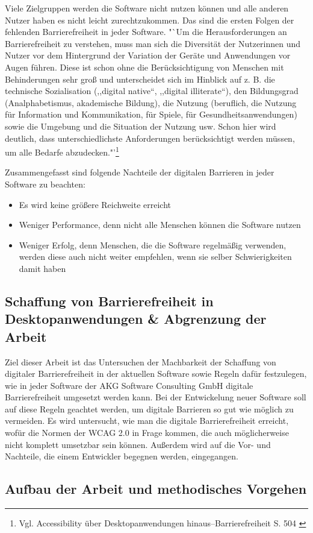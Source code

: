Viele Zielgruppen werden die Software nicht nutzen können und alle anderen Nutzer haben es nicht leicht zurechtzukommen. Das sind die ersten Folgen der fehlenden Barrierefreiheit in jeder Software. "`Um die Herausforderungen an Barrierefreiheit zu verstehen, muss man sich die Diversität der Nutzerinnen und Nutzer vor dem Hintergrund der Variation der Geräte und Anwendungen vor Augen führen. Diese ist schon ohne die Berücksichtigung von Menschen mit Behinderungen sehr groß und unterscheidet sich im Hinblick auf z. B. die technische Sozialisation (,,digital native“, ,,digital illiterate“), den Bildungsgrad (Analphabetismus, akademische Bildung), die Nutzung (beruflich, die Nutzung für Information und Kommunikation, für Spiele, für Gesundheitsanwendungen) sowie die Umgebung und die Situation der Nutzung usw. Schon hier wird deutlich, dass unterschiedlichste Anforderungen berücksichtigt werden müssen, um alle Bedarfe abzudecken."'\footnote{Vgl. Accessibility über Desktopanwendungen hinaus–Barrierefreiheit S. 504 \cite{buhler2017accessibility}}

Zusammengefasst sind folgende Nachteile der digitalen Barrieren in jeder Software zu beachten:
\vspace{1em}

\begin{itemize}
	\item Es wird keine größere Reichweite erreicht
	\item Weniger Performance, denn nicht alle Menschen können die Software nutzen
	\item Weniger Erfolg, denn Menschen, die die Software regelmäßig verwenden, werden diese auch nicht weiter empfehlen, wenn sie selber Schwierigkeiten damit haben
\end{itemize}

\subsection{Schaffung von Barrierefreiheit in Desktopanwendungen \& Abgrenzung der Arbeit}
Ziel dieser Arbeit ist das Untersuchen der Machbarkeit der Schaffung von digitaler Barrierefreiheit in der aktuellen Software sowie Regeln dafür festzulegen, wie in jeder Software der AKG Software Consulting GmbH digitale Barrierefreiheit umgesetzt werden kann. Bei der Entwickelung neuer Software soll auf diese Regeln geachtet werden, um digitale Barrieren so gut wie möglich zu vermeiden. Es wird untersucht, wie man die digitale Barrierefreiheit erreicht, wofür die Normen der \ac{WCAG} 2.0 in Frage kommen, die auch möglicherweise nicht komplett umsetzbar sein können. Außerdem wird auf die Vor- und Nachteile, die einem Entwickler begegnen werden, eingegangen.

\subsection{Aufbau der Arbeit und methodisches Vorgehen}
